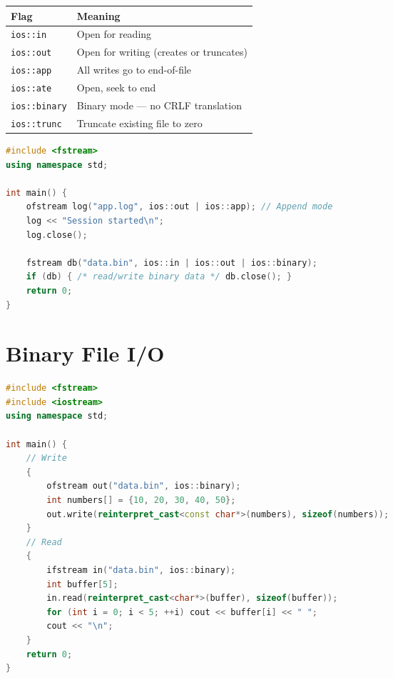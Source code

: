 \begin{center}
\begin{tabular}{|l|l|}
\hline
\textbf{Flag} & \textbf{Meaning} \\
\hline
\texttt{ios::in}     & Open for reading \\
\texttt{ios::out}    & Open for writing (creates or truncates) \\
\texttt{ios::app}    & All writes go to end-of-file \\
\texttt{ios::ate}    & Open, seek to end \\
\texttt{ios::binary} & Binary mode --- no CRLF translation \\
\texttt{ios::trunc}  & Truncate existing file to zero \\
\hline
\end{tabular}
\end{center}

\begin{lstlisting}[language=C++, caption={Combining open modes}]
#include <fstream>
using namespace std;

int main() {
    ofstream log("app.log", ios::out | ios::app); // Append mode
    log << "Session started\n";
    log.close();

    fstream db("data.bin", ios::in | ios::out | ios::binary);
    if (db) { /* read/write binary data */ db.close(); }
    return 0;
}
\end{lstlisting}

\section{Binary File I/O}
\label{sec:binary-io}

\begin{lstlisting}[language=C++, caption={Binary write and read}]
#include <fstream>
#include <iostream>
using namespace std;

int main() {
    // Write
    {
        ofstream out("data.bin", ios::binary);
        int numbers[] = {10, 20, 30, 40, 50};
        out.write(reinterpret_cast<const char*>(numbers), sizeof(numbers));
    }
    // Read
    {
        ifstream in("data.bin", ios::binary);
        int buffer[5];
        in.read(reinterpret_cast<char*>(buffer), sizeof(buffer));
        for (int i = 0; i < 5; ++i) cout << buffer[i] << " ";
        cout << "\n";
    }
    return 0;
}
\end{lstlisting}

